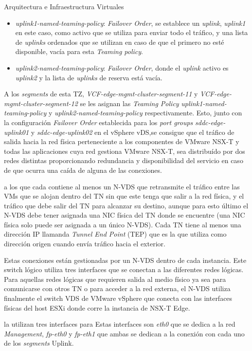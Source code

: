 \begin{subsection}{Arquitectura e Infraestructura Virtuales\cite{CFVirtInfraes}}
\begin{itemize}
\begin{itemize}
      \item \textit{uplink1-named-teaming-policy}: \textit{Failover Order}, se establece un \textit{uplink}, \textit{uplink1} en este caso, como activo que se utiliza para enviar todo el tráfico, y una lista de \textit{uplinks} ordenados que se utilizan en caso de que el primero no esté disponible, vacía para esta \textit{Teaming policy}.
      \item \textit{uplink2-named-teaming-policy}: \textit{Failover Order}, donde el \textit{uplink} activo es \textit{uplink2} y la lista de \textit{uplinks} de reserva está vacía.
    \end{itemize}
\end{itemize}
A los \textit{segments} de esta TZ, \textit{VCF-edge-mgmt-cluster-segment-11} y \textit{VCF-edge-mgmt-cluster-segment-12} se les asignan las \textit{Teaming Policy} \textit{uplink1-named-teaming-policy} y \textit{uplink2-named-teaming-policy} respectivamente. Esto, junto con la configuración \textit{Failover Order} establecida para los \textit{port groups} \textit{sddc-edge-uplink01} y \textit{sddc-edge-uplink02} en el vSphere vDS,se consigue que el tráfico de salida hacia la red física perteneciente a los componentes de VMware NSX-T y todas las aplicaciones cuya red gestiona VMware NSX-T, sea distribuído por dos redes distintas proporcionando redundancia y disponibilidad del servicio en caso de que ocurra una caída de alguna de las conexiones.

a los que cada contiene al menos un N-VDS que retransmite el tráfico entre las VMs que se alojan dentro del TN sin que este tenga que salir a la red física, y el tráfico que debe salir del TN para alcanzar su destino, aunque para esto último el N-VDS debe tener asignada una NIC física del TN donde se encuentre (una NIC física solo puede ser asignada a un único N-VDS). Cada TN tiene al menos una dirección IP llamanda \textit{Tunnel End Point} (TEP) que es la que utiliza como dirección origen cuando envía tráfico hacia el exterior.


Estas conexiones están gestionadas por un N-VDS dentro de cada instancia. Este switch lógico utiliza tres interfaces que se conectan a las diferentes redes lógicas. Para aquellas redes lógicas que requieren salida al medio físico ya sea para comunicarse con otros TN o para acceder a la red externa, el N-VDS utiliza finalmente el switch VDS de VMware vSphere que conecta con las interfaces físicas del host ESXi donde corre la instancia de NSX-T Edge.

la utilizan tres interfaces para  Estas interfaces son \textit{eth0} que se dedica a la red \textit{Management}, \textit{fp-eth0} y \textit{fp-eth1} que ambas se dedican a la conexión con cada uno de los \textit{segments} Uplink. 





\end{subsection}
